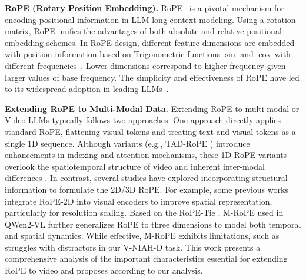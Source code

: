 \noindent \textbf{RoPE (Rotary Position Embedding).}
RoPE~\cite{su2024roformer} is a pivotal mechanism for encoding positional information in LLM long-context modeling. Using a rotation matrix, RoPE unifies the advantages of both absolute and relative positional embedding schemes. 
In RoPE design, different feature dimensions are embedded with position information based on Trigonometric functions $\sin$ and $\cos$ with different frequencies~\cite{peng2023yarn,liu2023scaling}.
Lower dimensions correspond to higher frequency given larger values of base frequency.
The simplicity and effectiveness of RoPE have led to its widespread adoption in leading LLMs~\cite{touvron2023llamaopenefficientfoundation, yang2024qwen2, gemmateam2024gemmaopenmodelsbased,cai2024internlm2, Sun2024MOSS}.

\noindent \textbf{Extending RoPE to Multi-Modal Data.}
Extending RoPE to multi-modal or Video LLMs typically follows two approaches.
One approach directly applies standard RoPE, flattening visual tokens and treating text and visual tokens as a single 1D sequence. Although variants (e.g., TAD-RoPE \cite{gao2024tc}) introduce enhancements in indexing and attention mechanisms, these 1D RoPE variants overlook the spatiotemporal structure of video and inherent inter-modal differences \cite{kexuefm10040,kexuefm10352,wang2024qwen2}.
In contrast, several studies have explored incorporating structural information to formulate the 2D/3D RoPE.
For example, some previous works \cite{agrawal2024pixtral12b,wang2024qwen2} integrate RoPE-2D into visual encoders to improve spatial representation, particularly for resolution scaling.
Based on the RoPE-Tie \cite{kexuefm10040}, M-RoPE \cite{wang2024qwen2} used in QWen2-VL further generalizes RoPE to three dimensions to model both temporal and spatial dynamics.
While effective, M-RoPE exhibits limitations, such as struggles with distractors in our V-NIAH-D task.
This work presents a comprehensive analysis of the important characteristics essential for extending RoPE to video and proposes \methodname according to our analysis.